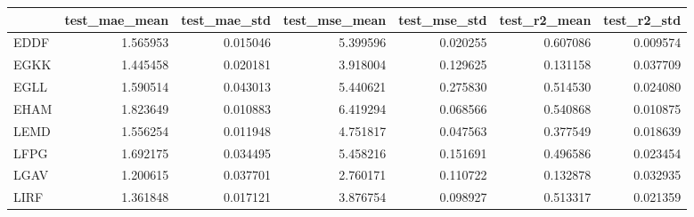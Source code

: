 \begin{tabular}{lrrrrrr}
\toprule
{} &  test_mae_mean &  test_mae_std &  test_mse_mean &  test_mse_std &  test_r2_mean &  test_r2_std \\
\midrule
EDDF &       1.565953 &      0.015046 &       5.399596 &      0.020255 &      0.607086 &     0.009574 \\
EGKK &       1.445458 &      0.020181 &       3.918004 &      0.129625 &      0.131158 &     0.037709 \\
EGLL &       1.590514 &      0.043013 &       5.440621 &      0.275830 &      0.514530 &     0.024080 \\
EHAM &       1.823649 &      0.010883 &       6.419294 &      0.068566 &      0.540868 &     0.010875 \\
LEMD &       1.556254 &      0.011948 &       4.751817 &      0.047563 &      0.377549 &     0.018639 \\
LFPG &       1.692175 &      0.034495 &       5.458216 &      0.151691 &      0.496586 &     0.023454 \\
LGAV &       1.200615 &      0.037701 &       2.760171 &      0.110722 &      0.132878 &     0.032935 \\
LIRF &       1.361848 &      0.017121 &       3.876754 &      0.098927 &      0.513317 &     0.021359 \\
\bottomrule
\end{tabular}
